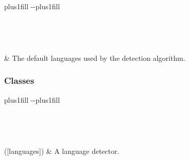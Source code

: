 \documentclass[letterpaper,10pt,english]{sphinxmanual}
\begin{document}
\begin{savenotes}
\sphinxatlongtablestart
\sphinxthistablewithglobalstyle
\sphinxthistablewithnovlinesstyle
\makeatletter
  \LTleft \@totalleftmargin plus1fill
  \LTright\dimexpr\columnwidth-\@totalleftmargin-\linewidth\relax plus1fill
\makeatother
\begin{longtable}{}
\sphinxtoprule
\endfirsthead

\\
\sphinxtoprule
\endhead

\sphinxbottomrule
{}\\
\endfoot

\endlastfoot
\sphinxtableatstartofbodyhook

\sphinxAtStartPar
{\hyperref[\detokenize{generated/bp_text.language:bp_text.language.default_languages}]{}}
&
\sphinxAtStartPar
The default languages used by the detection algorithm.
\\
\sphinxbottomrule
\end{longtable}
\sphinxtableafterendhook
\sphinxatlongtableend
\end{savenotes}
\subsubsection*{Classes}


\begin{savenotes}
\sphinxatlongtablestart
\sphinxthistablewithglobalstyle
\sphinxthistablewithnovlinesstyle
\makeatletter
  \LTleft \@totalleftmargin plus1fill
  \LTright\dimexpr\columnwidth-\@totalleftmargin-\linewidth\relax plus1fill
\makeatother
\begin{longtable}{}
\sphinxtoprule
\endfirsthead

\\
\sphinxtoprule
\endhead

\sphinxbottomrule
{}\\
\endfoot

\endlastfoot
\sphinxtableatstartofbodyhook

\sphinxAtStartPar
{\hyperref[\detokenize{generated/bp_text.language:bp_text.language.LanguageDetector}]{}}({[}languages{]})
&
\sphinxAtStartPar
A language detector.
\\
\sphinxbottomrule
\end{longtable}
\sphinxtableafterendhook
\sphinxatlongtableend
\end{savenotes}
\end{document}
